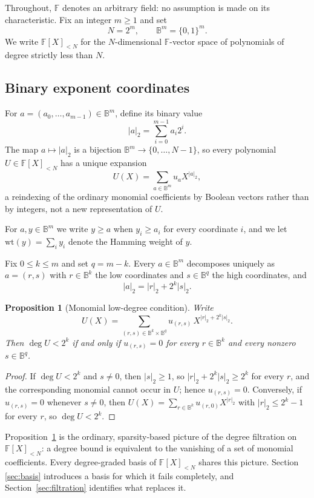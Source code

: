 \documentclass[preprint,3p,12pt,numbers]{elsarticle}
\newtheorem{proposition}[theorem]{Proposition}
\theoremstyle{definition}
\theoremstyle{remark}
\newcommand{\wt}{\mathrm{wt}}
\begin{document}
Throughout, $\mathbb{F}$ denotes an arbitrary field: no assumption is made
on its characteristic. Fix an integer $m \geq 1$ and set
\[
  N = 2^m, \qquad \mathbb{B}^m = \{0,1\}^m .
\]
We write $\mathbb{F}[X]_{<N}$ for the $N$-dimensional $\mathbb{F}$-vector
space of polynomials of degree strictly less than $N$.

\subsection{Binary exponent coordinates}
\label{subsec:binary}

For $a = (a_0,\dots,a_{m-1}) \in \mathbb{B}^m$, define its binary value
\[
  |a|_2 = \sum_{i=0}^{m-1} a_i 2^i .
\]
The map $a \mapsto |a|_2$ is a bijection $\mathbb{B}^m \to \{0,\dots,N-1\}$,
so every polynomial $U \in \mathbb{F}[X]_{<N}$ has a unique expansion
\[
  U(X) = \sum_{a \in \mathbb{B}^m} u_a X^{|a|_2},
\]
a reindexing of the ordinary monomial coefficients by Boolean vectors rather
than by integers, not a new representation of $U$.

For $a, y \in \mathbb{B}^m$ we write $y \geq a$ when $y_i \geq a_i$ for
every coordinate $i$, and we let $\wt(y) = \sum_i y_i$ denote the Hamming
weight of $y$.

Fix $0 \leq k \leq m$ and set $q = m-k$. Every $a \in \mathbb{B}^m$
decomposes uniquely as $a = (r,s)$ with $r \in \mathbb{B}^k$ the low
coordinates and $s \in \mathbb{B}^{q}$ the high coordinates, and
\[
  |a|_2 = |r|_2 + 2^k |s|_2 .
\]

\begin{proposition}[Monomial low-degree condition]
\label{prop:monomial-degree}
Write
\[
  U(X) =
  \sum_{(r,s) \in \mathbb{B}^k \times \mathbb{B}^{q}}
  u_{(r,s)}\, X^{|r|_2 + 2^k|s|_2}.
\]
Then $\deg U < 2^k$ if and only if
$u_{(r,s)} = 0$ for every $r \in \mathbb{B}^k$ and every nonzero
$s \in \mathbb{B}^{q}$.
\end{proposition}

\begin{proof}
If $\deg U < 2^k$ and $s \neq 0$, then $|s|_2 \geq 1$, so
$|r|_2 + 2^k|s|_2 \geq 2^k$ for every $r$, and the corresponding monomial
cannot occur in $U$; hence $u_{(r,s)}=0$. Conversely, if $u_{(r,s)}=0$
whenever $s \neq 0$, then
$U(X) = \sum_{r \in \mathbb{B}^k} u_{(r,0)} X^{|r|_2}$ with
$|r|_2 \leq 2^k-1$ for every $r$, so $\deg U < 2^k$.
\end{proof}

Proposition~\ref{prop:monomial-degree} is the ordinary, sparsity-based
picture of the degree filtration on $\mathbb{F}[X]_{<N}$: a degree bound
is equivalent to the vanishing of a set of monomial coefficients. Every
degree-graded basis of $\mathbb{F}[X]_{<N}$ shares this picture. Section~
\ref{sec:basis} introduces a basis for which it fails completely, and
Section~\ref{sec:filtration} identifies what replaces it.
\end{document}
